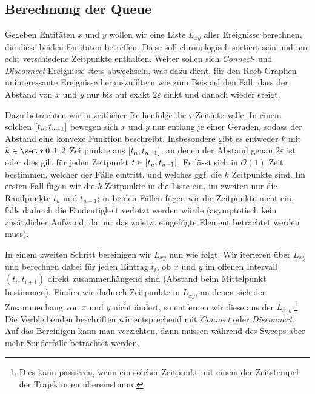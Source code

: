 \subsection{Berechnung der Queue} %
\label{sub:berechnung_queue}
Gegeben Entitäten $x$ und $y$ wollen wir eine Liste $L_{xy}$ aller Ereignisse berechnen, die diese beiden Entitäten betreffen.
Diese soll chronologisch sortiert sein und nur echt verschiedene Zeitpunkte enthalten.
Weiter sollen sich \emph{Connect}- und \emph{Disconnect}-Ereignisse stets abwechseln, was dazu dient, für den Reeb-Graphen uninteressante Ereignisse herauszufiltern wie zum Beispiel den Fall, dass der Abstand von $x$ und $y$ nur bis auf exakt $2 \varepsilon$ sinkt und danach wieder steigt.

Dazu betrachten wir in zeitlicher Reihenfolge die $\tau$ Zeitintervalle.
In einem solchen $\benbrace*{t_u,t_{u+1}}$ bewegen sich $x$ und $y$ nur entlang je einer Geraden, sodass der Abstand eine konvexe Funktion beschreibt.
Insbesondere gibt es entweder $k$ mit $k \in \set*{0,1,2}$ Zeitpunkte aus $\benbrace*{t_u,t_{u+1}}$, an denen der Abstand genau $2 \varepsilon$ ist oder dies gilt für jeden Zeitpunkt $t \in \benbrace*{t_u,t_{u+1}}$.
Es lässt sich in $\mathcal{O}(1)$ Zeit bestimmen, welcher der Fälle eintritt, und welches ggf. die $k$ Zeitpunkte sind.
Im ersten Fall fügen wir die $k$ Zeitpunkte in die Liste ein, im zweiten nur die Randpunkte $t_u$ und $t_{u+1}$; in beiden Fällen fügen wir die Zeitpunkte nicht ein, falls dadurch die Eindeutigkeit verletzt werden würde (asymptotisch kein zusätzlicher Aufwand, da nur das zuletzt eingefügte Element betrachtet werden muss).

In einem zweiten Schritt bereinigen wir $L_{xy}$ nun wie folgt: Wir iterieren über $L_{xy}$ und berechnen dabei für jeden Eintrag $t_i$, ob $x$ und $y$ im offenen Intervall $(t_i,t_{i+1})$ direkt zusammenhängend sind (Abstand beim Mittelpunkt bestimmen).
Finden wir dadurch Zeitpunkte in $L_{xy}$, an denen sich der Zusammenhang von $x$ und $y$ nicht ändert, so entfernen wir diese aus der $L_{x,y}$.\footnote{Dies kann passieren, wenn ein solcher Zeitpunkt mit einem der Zeitstempel der Trajektorien übereinstimmt}
Die Verbleibenden beschriften wir entsprechend mit \emph{Connect} oder \emph{Disconnect}.
Auf das Bereinigen kann man verzichten, dann müssen während des Sweeps aber mehr Sonderfälle betrachtet werden.

